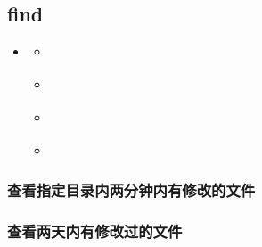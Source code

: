\documentclass[letterpaper,10pt,english]{sphinxmanual}
\begin{document}
\subsection{find}
\label{\detokenize{scripts/shell/find:find}}\label{\detokenize{scripts/shell/find::doc}}
\begin{sphinxShadowBox}
\begin{itemize}
\item {} 
\label{\detokenize{scripts/shell/find:id4}}{\hyperref[\detokenize{scripts/shell/find:find}]{}}
\begin{itemize}
\item {} 
\label{\detokenize{scripts/shell/find:id5}}{\hyperref[\detokenize{scripts/shell/find:id1}]{}}

\item {} 
\label{\detokenize{scripts/shell/find:id6}}{\hyperref[\detokenize{scripts/shell/find:id2}]{}}

\item {} 
\label{\detokenize{scripts/shell/find:id7}}{\hyperref[\detokenize{scripts/shell/find:id3}]{}}

\item {} 
\label{\detokenize{scripts/shell/find:id8}}{\hyperref[\detokenize{scripts/shell/find:a}]{}}

\end{itemize}

\end{itemize}
\end{sphinxShadowBox}


\subsubsection{查看指定目录内两分钟内有修改的文件}
\label{\detokenize{scripts/shell/find:id1}}
%
\begin{sphinxVerbatim}[commandchars=\\\{\}]
   
\end{sphinxVerbatim}


\subsubsection{查看两天内有修改过的文件}
\label{\detokenize{scripts/shell/find:id2}}
%
\begin{sphinxVerbatim}[commandchars=\\\{\}]
   
\end{sphinxVerbatim}
\end{document}
